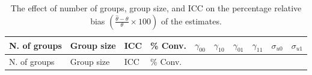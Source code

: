 \documentclass[12pt,oneside,a4paper]{reedthesis}
\begin{document}
\begin{longtable}[]{@{}llllllllll@{}}
\caption{\label{tab:tab1} The effect of number of groups, group size, and ICC on the percentage relative bias \((\frac{\hat{\theta}-\theta}{\theta} \times 100)\) of the estimates.}\tabularnewline
\toprule
\begin{minipage}[b]{0.11\columnwidth}\raggedright
N. of groups\strut
\end{minipage} & \begin{minipage}[b]{0.05\columnwidth}\raggedright
Group size\strut
\end{minipage} & \begin{minipage}[b]{0.05\columnwidth}\raggedright
ICC\strut
\end{minipage} & \begin{minipage}[b]{0.05\columnwidth}\raggedright
\% Conv.\strut
\end{minipage} & \begin{minipage}[b]{0.07\columnwidth}\raggedright
\(\gamma_{00}\)\strut
\end{minipage} & \begin{minipage}[b]{0.07\columnwidth}\raggedright
\(\gamma_{10}\)\strut
\end{minipage} & \begin{minipage}[b]{0.07\columnwidth}\raggedright
\(\gamma_{01}\)\strut
\end{minipage} & \begin{minipage}[b]{0.07\columnwidth}\raggedright
\(\gamma_{11}\)\strut
\end{minipage} & \begin{minipage}[b]{0.09\columnwidth}\raggedright
\(\sigma_{u0}\)\strut
\end{minipage} & \begin{minipage}[b]{0.09\columnwidth}\raggedright
\(\sigma_{u1}\)\strut
\end{minipage}\tabularnewline
\midrule
\endfirsthead
\toprule
\begin{minipage}[b]{0.11\columnwidth}\raggedright
N. of groups\strut
\end{minipage} & \begin{minipage}[b]{0.05\columnwidth}\raggedright
Group size\strut
\end{minipage} & \begin{minipage}[b]{0.05\columnwidth}\raggedright
ICC\strut
\end{minipage} & \begin{minipage}[b]{0.05\columnwidth}\raggedright
\% Conv.\strut
\end{minipage} & \begin{minipage}[b]{0.07\columnwidth}\raggedright

\end{minipage}
\end{longtable}
\end{document}
